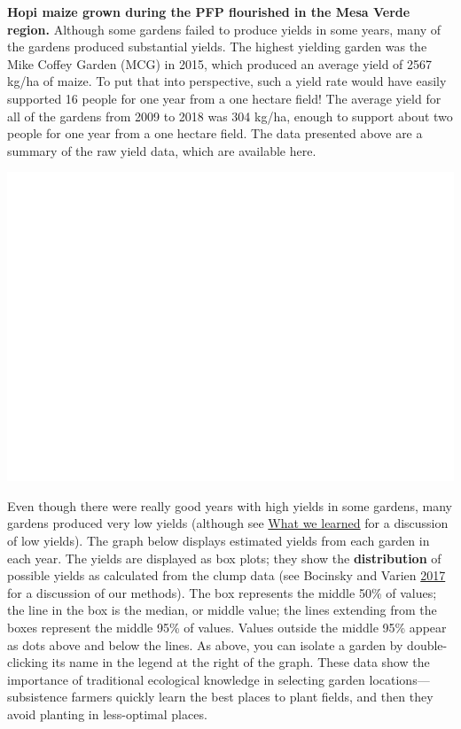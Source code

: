 \documentclass[12pt,]{article}
\begin{document}
\textbf{Hopi maize grown during the PFP flourished in the Mesa Verde region.} Although some gardens failed to produce yields in some years, many of the gardens produced substantial yields. The highest yielding garden was the Mike Coffey Garden (MCG) in 2015, which produced an average yield of 2567 kg/ha of maize. To put that into perspective, such a yield rate would have easily supported 16 people for one year from a one hectare field! The average yield for all of the gardens from 2009 to 2018 was 304 kg/ha, enough to support about two people for one year from a one hectare field. The data presented above are a summary of the raw yield data, which are available here.

\includegraphics{images/yield-summary-table-1.pdf}

Even though there were really good years with high yields in some gardens, many gardens produced very low yields (although see \protect\hyperlink{what-we-learned}{What we learned} for a discussion of low yields). The graph below displays estimated yields from each garden in each year. The yields are displayed as box plots; they show the \textbf{distribution} of possible yields as calculated from the clump data (see Bocinsky and Varien \protect\hyperlink{ref-Bocinsky2017}{2017} for a discussion of our methods). The box represents the middle 50\% of values; the line in the box is the median, or middle value; the lines extending from the boxes represent the middle 95\% of values. Values outside the middle 95\% appear as dots above and below the lines. As above, you can isolate a garden by double-clicking its name in the legend at the right of the graph. These data show the importance of traditional ecological knowledge in selecting garden locations---subsistence farmers quickly learn the best places to plant fields, and then they avoid planting in less-optimal places.
\end{document}
